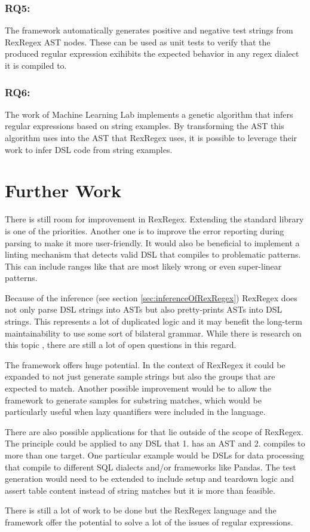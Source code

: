\subsubsection{RQ5: \RQfive}

The \utgast{} framework automatically generates positive and negative test strings from RexRegex AST nodes. These can be used as unit tests to verify that the produced regular expression exihibits the expected behavior in any regex dialect it is compiled to.

\subsubsection{RQ6: \RQsix}

The work of Machine Learning Lab implements a genetic algorithm that infers regular expressions based on string examples. By transforming the AST this algorithm uses into the AST that RexRegex uses, it is possible to leverage their work to infer DSL code from string examples.

\section{Further Work}

There is still room for improvement in RexRegex. Extending the standard library is one of the priorities. Another one is to improve the error reporting during parsing to make it more user-friendly. It would also be beneficial to implement a linting mechanism that detects valid DSL that compiles to problematic patterns. This can include ranges like  that are most likely wrong or even super-linear patterns.

Because of the inference (see section \ref{sec:inferenceOfRexRegex}) RexRegex does not only parse DSL strings into ASTs but also pretty-prints ASTs into DSL strings. This represents a lot of duplicated logic and it may benefit the long-term maintainability to use some sort of bilateral grammar. While there is research on this topic \cite{BidirectionalGrammarsForMachineCode}\cite{GuidedGrammarConvergence}, there are still a lot of open questions in this regard.

The \utgast{} framework offers huge potential. In the context of RexRegex it could be expanded to not just generate sample strings but also the groups that are expected to match. Another possible improvement would be to allow the framework to generate samples for substring matches, which would be particularly useful when lazy quantifiers were included in the language.

There are also possible applications for \utgast{} that lie outside of the scope of RexRegex. The principle could be applied to any DSL that 1. has an AST and 2. compiles to more than one target. One particular example would be DSLs for data processing that compile to different SQL dialects and/or frameworks like Pandas. The test generation would need to be extended to include setup and teardown logic and assert table content instead of string matches but it is more than feasible. 

There is still a lot of work to be done but the RexRegex language and the \utgast{} framework offer the potential to solve a lot of the issues of regular expressions.
